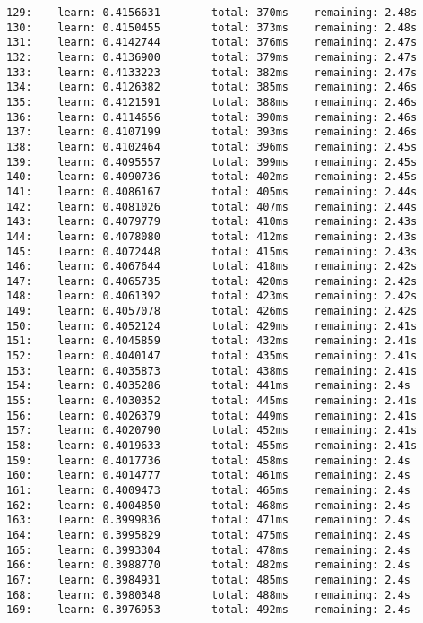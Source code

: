 \documentclass[11pt]{article}
\begin{document}
\begin{Verbatim}[commandchars=\\\{\}]
129:    learn: 0.4156631        total: 370ms    remaining: 2.48s
130:    learn: 0.4150455        total: 373ms    remaining: 2.48s
131:    learn: 0.4142744        total: 376ms    remaining: 2.47s
132:    learn: 0.4136900        total: 379ms    remaining: 2.47s
133:    learn: 0.4133223        total: 382ms    remaining: 2.47s
134:    learn: 0.4126382        total: 385ms    remaining: 2.46s
135:    learn: 0.4121591        total: 388ms    remaining: 2.46s
136:    learn: 0.4114656        total: 390ms    remaining: 2.46s
137:    learn: 0.4107199        total: 393ms    remaining: 2.46s
138:    learn: 0.4102464        total: 396ms    remaining: 2.45s
139:    learn: 0.4095557        total: 399ms    remaining: 2.45s
140:    learn: 0.4090736        total: 402ms    remaining: 2.45s
141:    learn: 0.4086167        total: 405ms    remaining: 2.44s
142:    learn: 0.4081026        total: 407ms    remaining: 2.44s
143:    learn: 0.4079779        total: 410ms    remaining: 2.43s
144:    learn: 0.4078080        total: 412ms    remaining: 2.43s
145:    learn: 0.4072448        total: 415ms    remaining: 2.43s
146:    learn: 0.4067644        total: 418ms    remaining: 2.42s
147:    learn: 0.4065735        total: 420ms    remaining: 2.42s
148:    learn: 0.4061392        total: 423ms    remaining: 2.42s
149:    learn: 0.4057078        total: 426ms    remaining: 2.42s
150:    learn: 0.4052124        total: 429ms    remaining: 2.41s
151:    learn: 0.4045859        total: 432ms    remaining: 2.41s
152:    learn: 0.4040147        total: 435ms    remaining: 2.41s
153:    learn: 0.4035873        total: 438ms    remaining: 2.41s
154:    learn: 0.4035286        total: 441ms    remaining: 2.4s
155:    learn: 0.4030352        total: 445ms    remaining: 2.41s
156:    learn: 0.4026379        total: 449ms    remaining: 2.41s
157:    learn: 0.4020790        total: 452ms    remaining: 2.41s
158:    learn: 0.4019633        total: 455ms    remaining: 2.41s
159:    learn: 0.4017736        total: 458ms    remaining: 2.4s
160:    learn: 0.4014777        total: 461ms    remaining: 2.4s
161:    learn: 0.4009473        total: 465ms    remaining: 2.4s
162:    learn: 0.4004850        total: 468ms    remaining: 2.4s
163:    learn: 0.3999836        total: 471ms    remaining: 2.4s
164:    learn: 0.3995829        total: 475ms    remaining: 2.4s
165:    learn: 0.3993304        total: 478ms    remaining: 2.4s
166:    learn: 0.3988770        total: 482ms    remaining: 2.4s
167:    learn: 0.3984931        total: 485ms    remaining: 2.4s
168:    learn: 0.3980348        total: 488ms    remaining: 2.4s
169:    learn: 0.3976953        total: 492ms    remaining: 2.4s

\end{Verbatim}
\end{document}
